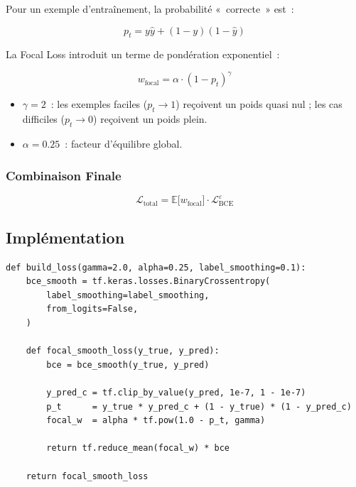 \documentclass[12pt, a4paper]{report}
\begin{document}
Pour un exemple d'entraînement, la probabilité «~correcte~» est~:

\begin{equation}
  p_t = y\hat{y} + (1-y)(1-\hat{y})
\end{equation}

La Focal Loss introduit un terme de pondération exponentiel~:

\begin{equation}
  \label{eq:focal}
  w_{\text{focal}} = \alpha \cdot (1 - p_t)^{\gamma}
\end{equation}

\begin{itemize}
  \item \(\gamma = 2\)~: les exemples faciles (\(p_t \to 1\)) reçoivent
        un poids quasi nul ; les cas difficiles (\(p_t \to 0\)) reçoivent
        un poids plein.
  \item \(\alpha = 0.25\)~: facteur d'équilibre global.
\end{itemize}

\subsubsection{Combinaison Finale}

\begin{equation}
  \label{eq:combined_loss}
  \boxed{
    \mathcal{L}_{\text{total}} = \mathbb{E}\bigl[w_{\text{focal}}\bigr]
    \cdot \mathcal{L}_{\text{BCE}}^{\varepsilon}
  }
\end{equation}

\subsection{Implémentation}

\begin{lstlisting}[caption={Fonction de perte combinée (brats\_classifier.py)},
                   label={lst:loss}]
def build_loss(gamma=2.0, alpha=0.25, label_smoothing=0.1):
    bce_smooth = tf.keras.losses.BinaryCrossentropy(
        label_smoothing=label_smoothing,
        from_logits=False,
    )

    def focal_smooth_loss(y_true, y_pred):
        bce = bce_smooth(y_true, y_pred)

        y_pred_c = tf.clip_by_value(y_pred, 1e-7, 1 - 1e-7)
        p_t      = y_true * y_pred_c + (1 - y_true) * (1 - y_pred_c)
        focal_w  = alpha * tf.pow(1.0 - p_t, gamma)

        return tf.reduce_mean(focal_w) * bce

    return focal_smooth_loss
\end{lstlisting}
\end{document}
